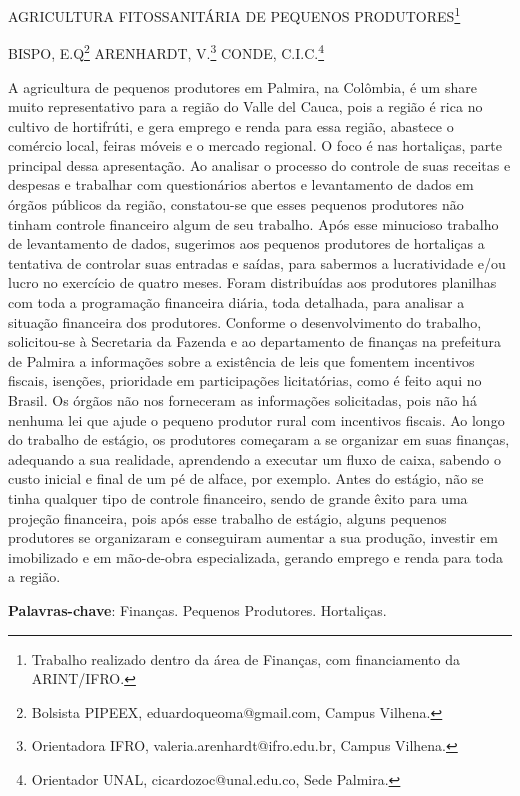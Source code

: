 \documentclass[article,12pt,onesidea,4paper,english,brazil]{abntex2}
\begin{document}
	
	
	\frenchspacing 
	
	\begin{center}
		\LARGE AGRICULTURA FITOSSANITÁRIA DE PEQUENOS PRODUTORES\footnote{Trabalho realizado dentro da área de Finanças, com financiamento da ARINT/IFRO.}
		
		\normalsize
		BISPO, E.Q\footnote{Bolsista PIPEEX, eduardoqueoma@gmail.com, Campus Vilhena.} 
		ARENHARDT, V.\footnote{Orientadora IFRO, valeria.arenhardt@ifro.edu.br, Campus Vilhena.} 
		CONDE, C.I.C.\footnote{Orientador UNAL, cicardozoc@unal.edu.co, Sede Palmira.} 
	\end{center}
	
	\noindent A agricultura de pequenos produtores em Palmira, na Colômbia, é um share muito representativo para a região do Valle del Cauca, pois a região é rica no cultivo de hortifrúti, e gera emprego e renda para essa região, abastece o comércio local, feiras móveis e o mercado regional. O foco é nas hortaliças, parte principal dessa apresentação. Ao analisar o processo do controle de suas receitas e despesas e trabalhar com questionários abertos e levantamento de dados em órgãos públicos da região, constatou-se que esses pequenos produtores não tinham controle financeiro algum de seu trabalho. Após esse minucioso trabalho de levantamento de dados, sugerimos aos pequenos produtores de hortaliças a tentativa de controlar suas entradas e saídas, para sabermos a lucratividade e/ou lucro no exercício de quatro meses. Foram distribuídas aos produtores planilhas com toda a programação financeira diária, toda detalhada, para analisar a situação financeira dos produtores. Conforme o desenvolvimento do trabalho, solicitou-se à Secretaria da Fazenda e ao departamento de finanças na prefeitura de Palmira a informações sobre a existência de leis que fomentem incentivos fiscais, isenções, prioridade em participações licitatórias, como é feito aqui no Brasil. Os órgãos não nos forneceram as informações solicitadas, pois não há nenhuma lei que ajude o pequeno produtor rural com incentivos fiscais. Ao longo do trabalho de estágio, os produtores começaram a se organizar em suas finanças, adequando a sua realidade, aprendendo a executar um fluxo de caixa, sabendo o custo inicial e final de um pé de alface, por exemplo. Antes do estágio, não se tinha qualquer tipo de controle financeiro, sendo de grande êxito para uma projeção financeira, pois após esse trabalho de estágio, alguns pequenos produtores se organizaram e conseguiram aumentar a sua produção, investir em imobilizado e em mão-de-obra especializada, gerando emprego e renda para toda a região.
	
	\vspace{\onelineskip}
	
	\noindent
	\textbf{Palavras-chave}: Finanças. Pequenos Produtores. Hortaliças.
	
\end{document}
